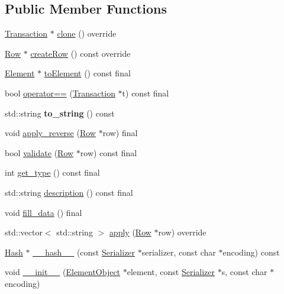 \subsection*{Public Member Functions}
\begin{DoxyCompactItemize}
\item 
\mbox{\hyperlink{classTransaction}{Transaction}} $\ast$ \mbox{\hyperlink{classRewardTransaction_a414728d857fcf05295a7f3f4fa024dc1}{clone}} () override
\item 
\mbox{\hyperlink{classRow}{Row}} $\ast$ \mbox{\hyperlink{classRewardTransaction_ad43c1d706406f40d43f433b0d0b0b510}{create\+Row}} () const override
\item 
\mbox{\hyperlink{classElement}{Element}} $\ast$ \mbox{\hyperlink{classReward_a0ecd536148463880f9980fe415b6eb1d}{to\+Element}} () const final
\item 
bool \mbox{\hyperlink{classReward_ab2cd65f16c670e3e9d8cfe84a6dc56cb}{operator==}} (\mbox{\hyperlink{classTransaction}{Transaction}} $\ast$t) const final
\item 
\mbox{\label{classReward_a0d65cd39eb260091d1f2cf19e2e71de7}} 
std\+::string {\bfseries to\+\_\+string} () const
\item 
void \mbox{\hyperlink{classReward_a494c9d6e0a220729f675fd6131cfb9af}{apply\+\_\+reverse}} (\mbox{\hyperlink{classRow}{Row}} $\ast$row) final
\item 
bool \mbox{\hyperlink{classReward_a9c9a3219ba6b8b068f7f1cccc779b1b5}{validate}} (\mbox{\hyperlink{classRow}{Row}} $\ast$row) const final
\item 
int \mbox{\hyperlink{classReward_a1d3d05263d54771a314927d09585968c}{get\+\_\+type}} () const final
\item 
std\+::string \mbox{\hyperlink{classReward_a95e98fc9dbbc9da47cee243adc1932d2}{description}} () const final
\item 
void \mbox{\hyperlink{classReward_a30a40e2eefd0aea969fab46d1e22d145}{fill\+\_\+data}} () final
\item 
std\+::vector$<$ std\+::string $>$ \mbox{\hyperlink{classReward_aae55ec2aa2aa31cc365c80cb42be9ab5}{apply}} (\mbox{\hyperlink{classRow}{Row}} $\ast$row) override
\item 
\mbox{\hyperlink{classHash}{Hash}} $\ast$ \mbox{\hyperlink{classTransaction_a1f0df166c34d6a38a991544cf98c0356}{\+\_\+\+\_\+hash\+\_\+\+\_\+}} (const \mbox{\hyperlink{classSerializer}{Serializer}} $\ast$serializer, const char $\ast$encoding) const
\item 
void \mbox{\hyperlink{classComponent_a28212595f8ee85fe009bd233bc99b2fc}{\+\_\+\+\_\+init\+\_\+\+\_\+}} (\mbox{\hyperlink{classElementObject}{Element\+Object}} $\ast$element, const \mbox{\hyperlink{classSerializer}{Serializer}} $\ast$s, const char $\ast$encoding)
\end{DoxyCompactItemize}

